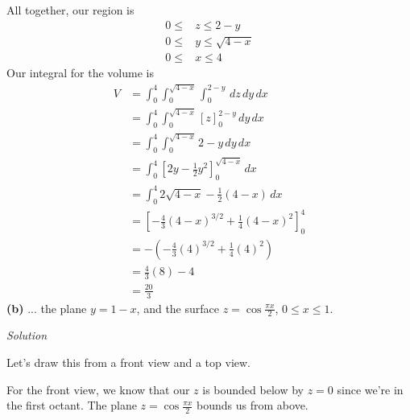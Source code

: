 \documentclass{article}
\newcommand{\lrp}[1]{\left( #1 \right)}
\newcommand{\lrb}[1]{\left[ #1 \right]}
\newcommand{\Solution}{\textit{Solution}}
\begin{document}
All together, our region is
\begin{align*}
    0\leq &z \leq 2- y\\
    0\leq &y \leq \sqrt{4-x}\tag{$x=4-y^2\implies y^2=4-x$}\\
    0\leq & x \leq 4
\end{align*}
Our integral for the volume is
\begin{align*}
    V&=\int_0^4\int_0^{\sqrt{4-x}}\int_0^{2-y}\,dz\,dy\,dx\\
    &=\int_0^4\int_0^{\sqrt{4-x}}\lrb{z}_0^{2-y}\,dy\,dx\\
    &=\int_0^4\int_0^{\sqrt{4-x}} 2-y\,dy\,dx\\
    &=\int_0^4\lrb{2y-\frac{1}{2}y^2}_0^{\sqrt{4-x}}\,dx\\
    &=\int_0^4 2\sqrt{4-x}-\frac{1}{2}(4-x)\,dx\\
    &=\lrb{-\frac{4}{3}(4-x)^{3/2}+\frac{1}{4}(4-x)^2}_0^4\\
    &=-\lrp{-\frac{4}{3}(4)^{3/2}+\frac{1}{4}(4)^2}\\
    &=\frac{4}{3}(8)-4\\
    &=\boxed{\frac{20}{3}}
\end{align*}
\textbf{(b)} ... the plane $y=1-x$, and the surface $\displaystyle z=\cos \frac{\pi x}{2}$, $0\leq x \leq 1$.

\Solution

Let's draw this from a front view and a top view.

For the front view, we know that our $z$ is bounded below by $z=0$ since we're in the first octant. The plane $\displaystyle z=\cos\frac{\pi x}{2}$ bounds us from above.
\end{document}
